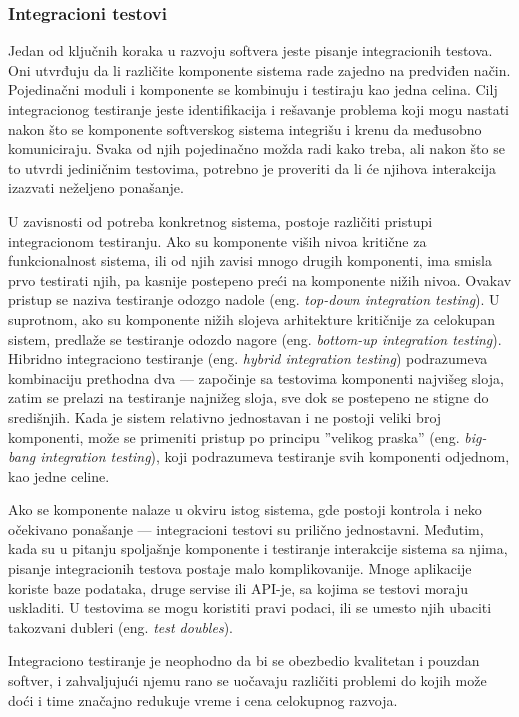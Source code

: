 \documentclass[12pt,oneside]{memoir}
\begin{document}
\subsubsection{Integracioni testovi}
\label{sec:integration}
\par Jedan od ključnih koraka u razvoju softvera jeste pisanje integracionih testova. Oni utvrđuju da li različite komponente sistema rade zajedno na predviđen način. Pojedinačni moduli i komponente se kombinuju i testiraju kao jedna celina. Cilj integracionog testiranje jeste identifikacija i rešavanje problema koji mogu nastati nakon što se komponente softverskog sistema integrišu i krenu da međusobno komuniciraju. Svaka od njih pojedinačno možda radi kako treba, ali nakon što se to utvrdi jediničnim testovima, potrebno je proveriti da li će njihova interakcija izazvati neželjeno ponašanje. 
\par U zavisnosti od potreba konkretnog sistema, postoje različiti pristupi integracionom testiranju. Ako su komponente viših nivoa kritične za funkcionalnost sistema, ili od njih zavisi mnogo drugih komponenti, ima smisla prvo testirati njih, pa kasnije postepeno preći na komponente nižih nivoa. Ovakav pristup se naziva testiranje odozgo nadole (eng. \emph{top-down integration testing}). U suprotnom, ako su komponente nižih slojeva arhitekture kritičnije za celokupan sistem, predlaže se testiranje odozdo nagore (eng. \emph{bottom-up integration testing}). Hibridno integraciono testiranje (eng. \emph{hybrid integration testing}) podrazumeva kombinaciju prethodna dva --- započinje sa testovima komponenti najvišeg sloja, zatim se prelazi na testiranje najnižeg sloja, sve dok se postepeno ne stigne do središnjih. Kada je sistem relativno jednostavan i ne postoji veliki broj komponenti, može se primeniti pristup po principu ''velikog praska'' (eng. \emph{big-bang integration testing}), koji podrazumeva testiranje svih komponenti odjednom, kao jedne celine. 
\par Ako se komponente nalaze u okviru istog sistema, gde postoji kontrola i neko očekivano ponašanje --- integracioni testovi su prilično jednostavni. Međutim, kada su u pitanju spoljašnje komponente i testiranje interakcije sistema sa njima, pisanje integracionih testova postaje malo komplikovanije. Mnoge aplikacije koriste baze podataka, druge servise ili API-je, sa kojima se testovi moraju uskladiti. U testovima se mogu koristiti pravi podaci, ili se umesto njih ubaciti takozvani dubleri (eng. \textit{test doubles}).
\par Integraciono testiranje je neophodno da bi se obezbedio kvalitetan i pouzdan softver, i zahvaljujući njemu rano se uočavaju različiti problemi do kojih može doći i time značajno redukuje vreme i cena celokupnog razvoja. 
\end{document}
